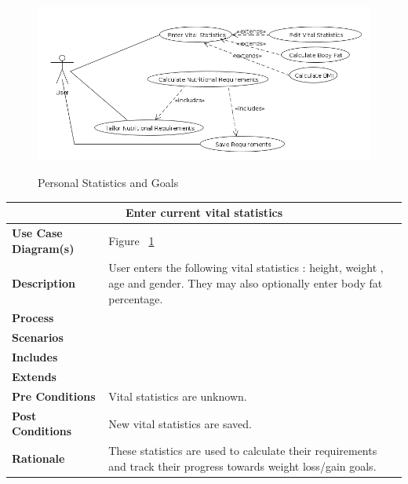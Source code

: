 \documentclass[12pt]{article}
\begin{document}
\begin{figure}[h]
\caption{Personal Statistics and Goals}
\centering
\includegraphics[width = 1\textwidth]{TailorAndSaveRequirements.png}
\label{useCaseDiagram:PersonalGoalsAndStatistics}
\end{figure}


\begin{center}
\begin{tabularx}{\textwidth}{ |X|X|}
\hline
\multicolumn{2}{|c|}{\textbf{Enter current vital statistics}}\\
\hline
\hline
\textbf{Use Case Diagram(s)} & Figure ~\ref{useCaseDiagram:PersonalGoalsAndStatistics}\\ \hline
\textbf{Description} & User enters the following vital statistics : height, weight , age and gender. They may also optionally enter body fat percentage.  \\ \hline
\textbf{Process} & \\ \hline
\textbf{Scenarios} & \\ \hline
\textbf{Includes} & \\ \hline
\textbf{Extends} & \\ \hline
\textbf{Pre Conditions} & Vital statistics are unknown. \\ \hline
\textbf{Post Conditions} & New vital statistics are saved.\\ \hline
\textbf{Rationale} & These statistics are used to calculate their requirements and track their progress towards weight loss/gain goals.\\ \hline
\end{tabularx}
\end{center}
\end{document}
